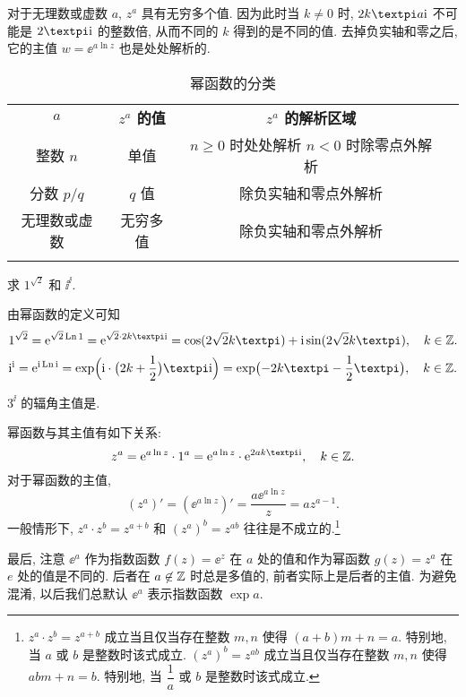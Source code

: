 对于无理数或虚数 $a$, $z^a$ 具有无穷多个值.
因为此时当 $k\neq0$ 时, $2k\cpi a \ii$ 不可能是 $2\cpi \ii$ 的整数倍, 从而不同的 $k$ 得到的是不同的值.
去掉负实轴和零之后, 它的主值 $w=\ee^{a\ln z}$ 也是处处解析的.

\begin{table}[H]
  \centering
  \begin{tabular}{cccc}
    \topcolorrule
      \bf $a$&
      \bf $z^a$ 的值&
      \bf  $z^a$ 的解析区域\\
    \topcolorrule
      整数 $n$&
      单值&
      \makecell{$n\ge0$ 时处处解析\\$n<0$ 时除零点外解析}\\
    \midcolorrule
      分数 $p/q$&
      $q$ 值&
      除负实轴和零点外解析\\
    \midcolorrule
      无理数或虚数&
      无穷多值&
      除负实轴和零点外解析\\
    \bottomcolorrule
  \end{tabular}
  \caption{幂函数的分类}
\end{table}

\begin{example}
  求 $1^{\sqrt 2}$ 和 $\ii^\ii$.
\end{example}
\begin{solution}
  由幂函数的定义可知
  \[
    1^{\sqrt2}=\ee^{\sqrt2\Ln1}
      =\ee^{\sqrt 2\cdot 2k\cpi\ii}
      =\cos(2\sqrt 2k\cpi)+\ii\sin(2\sqrt 2k\cpi), \quad k\in\BZ.
  \]
  \[
    \ii^\ii=\ee^{\ii\Ln \ii}
      =\exp\Bigl(\ii\cdot\bigl(2k+\half\bigr)\cpi\ii\Bigr)
      =\exp\bigl(-2k\cpi-\half\cpi\bigr), \quad k\in\BZ.
  \]
\end{solution}

\begin{exercise}
  $3^\ii$ 的辐角主值是\fillblank{}.
\end{exercise}

幂函数与其主值有如下关系:
\[
  z^a=\ee^{a\ln z}\cdot 1^a
    =\ee^{a\ln z}\cdot \ee^{2ak\cpi\ii},\quad k\in\BZ.
\]
对于幂函数的主值,
\[
  (z^a)'=(\ee^{a\ln z})'=\frac{a\ee^{a\ln z}}z=az^{a-1}.
\]
一般情形下, $z^a\cdot z^b=z^{a+b}$ 和 $(z^a)^b=z^{ab}$ 往往是不成立的.\footnote{%
  $z^a\cdot z^b=z^{a+b}$ 成立当且仅当存在整数 $m,n$ 使得 $(a+b)m+n=a$.
  特别地, 当 $a$ 或 $b$ 是整数时该式成立.
  $(z^a)^b=z^{ab}$ 成立当且仅当存在整数 $m,n$ 使得 $abm+n=b$.
  特别地, 当 $\dfrac1a$ 或 $b$ 是整数时该式成立.
}

最后, 注意 $\ee^a$ 作为指数函数 $f(z)=\ee^z$ 在 $a$ 处的值和作为幂函数 $g(z)=z^a$ 在 $e$ 处的值是\alert{不同}的.
后者在 $a\not\in{\mathbb{Z}}$ 时总是多值的, 前者实际上是后者的主值.
为避免混淆, 以后我们总\alert{默认 $\ee^a$ 表示指数函数 $\exp a$}.


